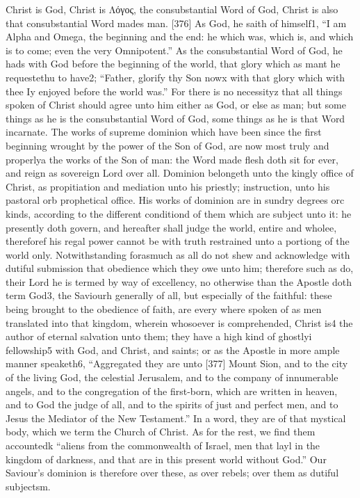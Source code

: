 Christ is God, Christ is Λόγος, the consubstantial Word of God, Christ is also that consubstantial Word mades man. [376] As God, he saith of himself1, “I am Alpha and Omega, the beginning and the end: he which was, which is, and which is to come; even the very Omnipotent.” As the consubstantial Word of God, he hads with God before the beginning of the world, that glory which as mant he requestethu to have2; “Father, glorify thy Son nowx with that glory which with thee Iy enjoyed before the world was.” For there is no necessityz that all things spoken of Christ should agree unto him either as God, or else as man; but some things as he is the consubstantial Word of God, some things as he is that Word incarnate. The works of supreme dominion which have been since the first beginning wrought by the power of the Son of God, are now most truly and properlya the works of the Son of man: the Word made flesh doth sit for ever, and reign as sovereign Lord over all. Dominion belongeth unto the kingly office of Christ, as propitiation and mediation unto his priestly; instruction, unto his pastoral orb prophetical office. His works of dominion are in sundry degrees orc kinds, according to the different conditiond of them which are subject unto it: he presently doth govern, and hereafter shall judge the world, entire and wholee, thereforef his regal power cannot be with truth restrained unto a portiong of the world only. Notwithstanding forasmuch as all do not shew and acknowledge with dutiful submission that obedience which they owe unto him; therefore such as do, their Lord he is termed by way of excellency, no otherwise than the Apostle doth term God3, the Saviourh generally of all, but especially of the faithful: these being brought to the obedience of faith, are every where spoken of as men translated into that kingdom, wherein whosoever is comprehended, Christ is4 the author of eternal salvation unto them; they have a high kind of ghostlyi fellowship5 with God, and Christ, and saints; or as the Apostle in more ample manner speaketh6, “Aggregated they are unto [377] Mount Sion, and to the city of the living God, the celestial Jerusalem, and to the company of innumerable angels, and to the congregation of the first-born, which are written in heaven, and to God the judge of all, and to the spirits of just and perfect men, and to Jesus the Mediator of the New Testament.” In a word, they are of that mystical body, which we term the Church of Christ. As for the rest, we find them accountedk “aliens from the commonwealth of Israel, men that layl in the kingdom of darkness, and that are in this present world without God.” Our Saviour’s dominion is therefore over these, as over rebels; over them as dutiful subjectsm.

